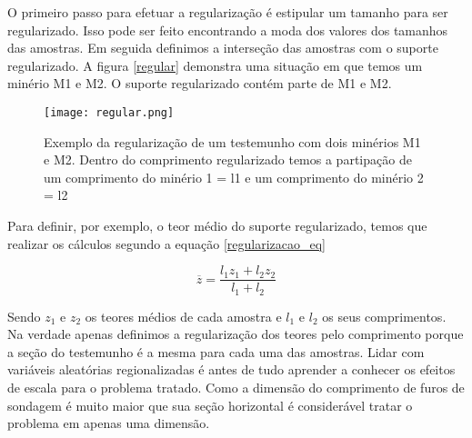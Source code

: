 O primeiro passo para efetuar a regularização é estipular um tamanho para ser regularizado. Isso pode ser feito encontrando a moda dos valores dos tamanhos das amostras. Em seguida definimos a interseção das amostras com o suporte regularizado. A figura \eqref{regular} demonstra uma situação em que temos um minério M1 e M2. O suporte regularizado contém parte de M1 e M2.
   
\begin{figure}[H]
	\centering
	\texttt{[image: regular.png]}	
	\caption{Exemplo da regularização de um testemunho com dois minérios M1 e M2. Dentro do comprimento regularizado temos a partipação de um comprimento do minério 1 = l1 e um comprimento do minério 2 = l2 }
	\label{regular}
\end{figure}

Para definir, por exemplo, o teor médio do suporte regularizado, temos que realizar os cálculos segundo a equação \eqref{regularizacao_eq}

\begin{equation}\label{regularizacao_eq}
 \overline{z} = \frac{l_{1}z_{1} + l_{2}z_{2}}{l_{1}+l_{2}}
\end{equation}

Sendo $z_{1}$ e $z_{2}$ os teores médios de cada amostra e $l_{1}$ e $l_{2}$ os seus comprimentos. Na verdade apenas definimos a regularização dos teores pelo comprimento porque a seção do testemunho é a mesma para cada uma das amostras. Lidar com variáveis aleatórias regionalizadas é antes de tudo aprender a conhecer os efeitos de escala para o problema tratado. Como a dimensão do comprimento de furos de sondagem é muito maior que sua seção horizontal é considerável tratar o problema em apenas uma dimensão. 
